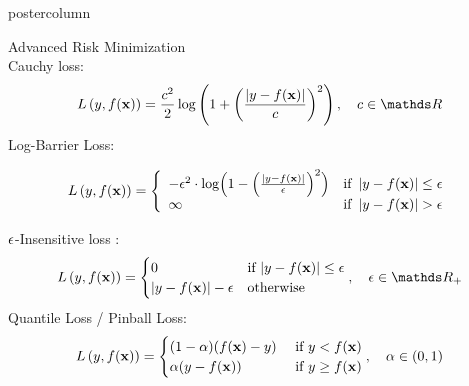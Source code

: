 \documentclass{beamer}
\begin{document}
\begin{frame}[fragile]{}
\begin{columns}
\begin{column}{.31\textwidth}
\begin{beamercolorbox}[center]{postercolumn}
\begin{minipage}{.98\textwidth}
{\begin{myblock}{Advanced Risk Minimization}
$$$$
Cauchy loss:
%
$$
\Lxy = \frac{c^2}{2} \log \left( 1 + \left( \frac{\left|y - \fx\right|}{c}\right)^2 \right), 
\quad c \in \R
$$
Log-Barrier Loss:
%
\begin{small}
\[
L\left(y, f(\mathbf{x})\right) = \left\{\begin{array}{lr}
	-\epsilon^{2} \cdot \log \Bigl( 1 - \Bigl(\frac{\left|y - f(\mathbf{x})\right|}{\epsilon}\Bigr)^2 \Bigr) & \text{if } \left|y-f(\mathbf{x})\right| \leq \epsilon \\
	\infty & \text{if } \left|y-f(\mathbf{x})\right|  > \epsilon
\end{array}\right.
\]
\end{small}
%
$\epsilon$-Insensitive loss :
%
$$
\Lxy =  \begin{cases}
0  & \text{if } |y - \fx| \le \epsilon \\
|y - \fx|-\epsilon & \text{otherwise }
\end{cases}, \quad \epsilon \in \R_{+}
$$
%
Quantile Loss / Pinball Loss:
%
$$
L\left(y, f(\mathbf{x})\right) = \begin{cases} (1 - \alpha) (f(\mathbf{x}) - y) & \text{ if } y < f(\mathbf{x})\\
\alpha (y - f(\mathbf{x})) & \text{ if } y \ge f(\mathbf{x})
\end{cases}, \quad \alpha \in (0, 1)
$$
%  
	\\


\end{myblock}}
\end{minipage}
\end{beamercolorbox}
\end{column}
\end{columns}
\end{frame}
\end{document}
